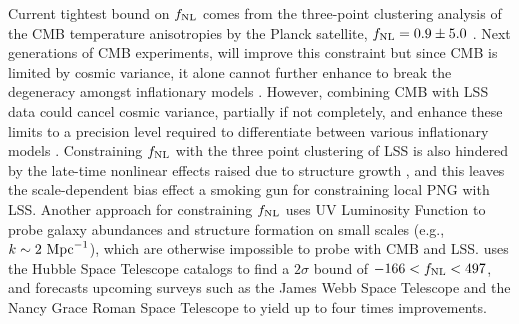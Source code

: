 Current tightest bound on $f_{\rm NL}$ comes from the three-point clustering analysis of the CMB temperature anisotropies by the Planck satellite, $f_{\rm NL}=0.9\pm 5.0$ \citep{akrami2019planck}. Next generations of CMB experiments, will improve this constraint but since CMB is limited by cosmic variance, it alone cannot further enhance to break the degeneracy amongst inflationary models \citep[see, e.g.,][]{ade2019simons}. However, combining CMB with LSS data could cancel cosmic variance, partially if not completely, and enhance these limits to a precision level required to differentiate between various inflationary models \citep[see, e.g.,][]{schmittfull2018PhRvD}.  Constraining $f_{\rm NL}$ with the three point clustering of LSS is also hindered by the late-time nonlinear effects raised due to structure growth \citep{baldauf2011galaxy, baldauf2011primordial}, and this leaves the scale-dependent bias effect a smoking gun for constraining local PNG with LSS. Another approach for constraining $f_{\rm NL}$ uses UV Luminosity Function to probe galaxy abundances and structure formation on small scales (e.g., $k \sim 2~{\rm Mpc}^{-1}$), which are otherwise impossible to probe with CMB and LSS. \cite{sabti2021JCAP} uses the Hubble Space Telescope catalogs \citep{bouwens2015ApJ} to find a $2\sigma$ bound of $-166<f_{\rm NL}<497$, and forecasts upcoming surveys such as the James Webb Space Telescope and the Nancy Grace Roman Space Telescope to yield up to four times improvements.

